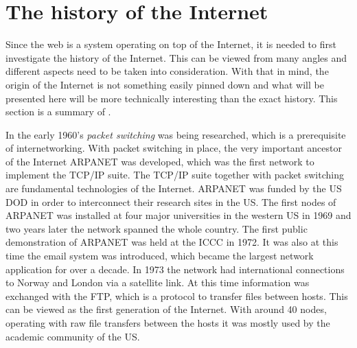   \section{The history of the Internet}\label{sec:history-internet}
    \begin{metatext}
      Since the \gls{web} is a system operating on top of the Internet, it is needed to first investigate the history of the Internet.
      This can be viewed from many angles and different aspects need to be taken into consideration.
      With that in mind, the origin of the Internet is not something easily pinned down and what will be presented here will be more technically interesting than the exact history.
      This section is a summary of .
    \end{metatext}


    In the early 1960's \emph{packet switching} was being researched, which is a prerequisite of internetworking.
    With packet switching in place, the very important ancestor of the Internet \gls{ARPANET} was developed, which was the first network to implement the \gls{TCP}/\gls{IP} suite.
    The \gls{TCP}/\gls{IP} suite together with packet switching are fundamental technologies of the Internet.
    \gls{ARPANET} was funded by the \gls{US} \gls{DOD} in order to interconnect their research sites in the \gls{US}.
    The first nodes of \gls{ARPANET} was installed at four major universities in the western \gls{US} in 1969 and two years later the network spanned the whole country.
    The first public demonstration of \gls{ARPANET} was held at the \gls{ICCC} in 1972.
    It was also at this time the email system was introduced, which became the largest network application for over a decade.
    In 1973 the network had international connections to Norway and London via a satellite link.
    At this time information was exchanged with the \gls{FTP}, which is a protocol to transfer files between hosts.
    This can be viewed as the first generation of the Internet. With around 40 nodes, operating with raw file transfers between the hosts it was mostly used by the academic community of the \gls{US}.

